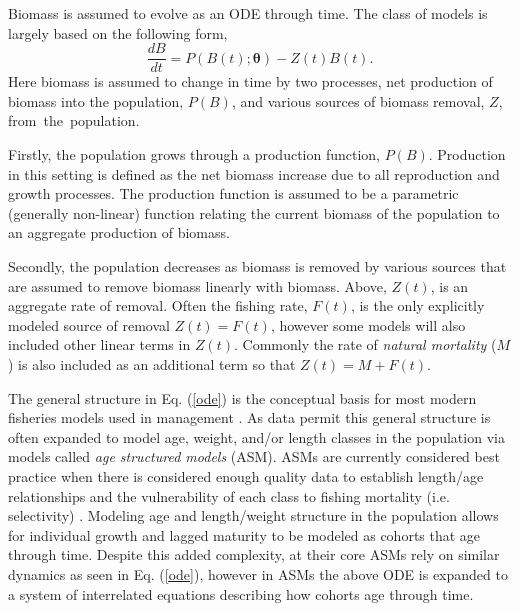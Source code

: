 \documentclass[12pt]{ucscthesis}
\begin{document}
% 
Biomass is assumed to evolve as an ODE through time. 
The class of models is largely based on the following form,
%
\begin{equation}
\frac{dB}{dt} = P(B(t); \bm{\theta}) - Z(t)B(t). \label{ode}
\end{equation}
Here biomass is assumed to change in time by two processes, net production of
biomass into the population, $P(B)$, and various sources of biomass removal, 
$Z$, \mbox{from the population.}

Firstly, the population grows through a production function, $P(B)$. Production
in this setting is defined as the net biomass increase due to all reproduction
and growth processes.
The production function is assumed to be a parametric (generally non-linear) 
function relating the current biomass of the population to an aggregate 
production of biomass.

%
Secondly, the population decreases as biomass is removed by various sources 
that are assumed to remove biomass linearly with biomass. Above, $Z(t)$, is 
an aggregate rate of removal. Often the fishing rate, $F(t)$, is the only 
explicitly modeled source of removal $Z(t)=F(t)$, however some models will 
also included other linear terms in $Z(t)$. Commonly the rate of {\it natural 
mortality} ($M$) is also included as an additional term so that $Z(t)=M+F(t)$.

%

%
The general structure in Eq. (\ref{ode}) is the conceptual basis for most 
modern fisheries models used in management \cite{hilborn_quantitative_1992, methot_stock_2013, winker_jabba_2018}. 
As data permit this general structure is often expanded to model age, weight, 
and/or length classes \cite{schnute_general_1987, fournier_length-based_1987} 
in the population via models called {\it age structured models} (ASM). ASMs 
are currently considered best practice when there is %
considered enough quality data to establish length/age relationships and 
the vulnerability of each class to fishing mortality (i.e. selectivity)
\cite{maunder_review_2013, cope_stock_2023}. 
Modeling age and length/weight structure in the population allows for 
individual growth and lagged maturity to be modeled as cohorts that age through time. 
Despite this added complexity, at their core ASMs rely on similar dynamics as 
seen in Eq. (\ref{ode}), however in ASMs the above ODE is expanded to a system 
of interrelated equations describing how cohorts age through time. %
\end{document}
